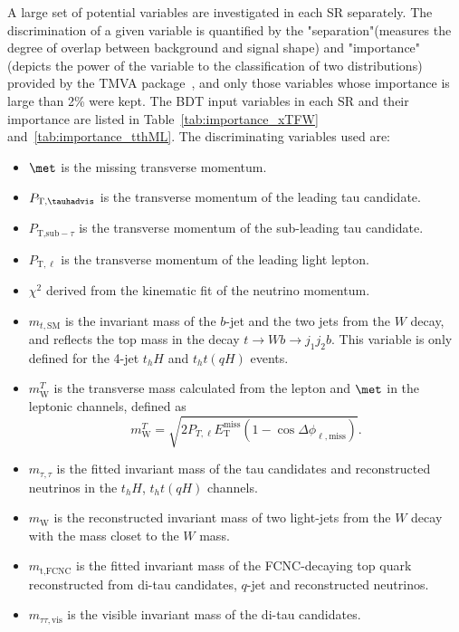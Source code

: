 A large set of potential variables are investigated in each SR separately. The discrimination of a given variable is quantified by the "separation"(measures the degree of overlap between background and signal shape) and "importance"(depicts the power of the variable to the classification of two distributions) provided by the TMVA package~\cite{Hocker:2007ht}, and only those variables whose importance is large than 2\% were kept.
The BDT input variables in each SR and their importance are listed in Table~\ref{tab:importance_xTFW} and~\ref{tab:importance_tthML}. The discriminating variables used are:
\begin{itemize}
\item $\met$ is the missing transverse momentum.
\item $P_{\text{T,\tauhadvis}} $ is the transverse momentum of the leading tau candidate.
\item $P_{\text{T,sub}-\tau}$ is the transverse momentum of the sub-leading tau candidate.
\item $P_{\text{T},\ell}$ is the transverse momentum of the leading light lepton.
\item $\chi^2$ derived from the kinematic fit of the neutrino momentum.
\item $m_{t,\text{SM}}$ is the invariant mass of the $b$-jet and the two jets from the $W$ decay, and reflects the top mass in the decay $t\to Wb \to j_1j_2b$. This variable is only defined for the 4-jet $t_hH$ and $t_ht(qH)$ events.
\item $m^{T}_{\text{W}}$ is the transverse mass calculated from the lepton and $\met$ in the leptonic channels, defined as
\begin{equation}
m^{T}_{\text{W}} = \sqrt{2 P_{T,\ell} E_{\text{T}}^{\text{miss}} \left(1-\cos\Delta\phi_{\ell,\text{miss}} \right)}.  
\end{equation}
\item $m_{\tau,\tau}$ is the fitted invariant mass of the tau candidates and reconstructed neutrinos in the $t_hH$, $t_ht(qH)$ channels. 
\item $m_{\text{W}}$ is the reconstructed invariant mass of two light-jets from the $W$ decay with the mass closet to the $W$ mass.
\item $m_{\text{t},\text{FCNC}}$ is the fitted invariant mass of the FCNC-decaying top quark reconstructed from di-tau candidates, $q$-jet and reconstructed neutrinos.
\item $m_{\tau\tau,\text{vis}}$ is the visible invariant mass of the di-tau candidates. %

\end{itemize}
